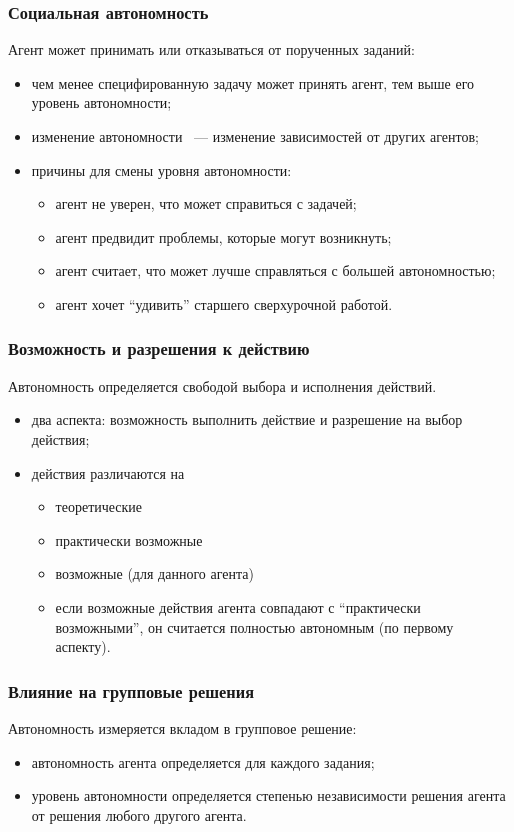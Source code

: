 \documentclass{beamer}
\begin{document}
\begin{frame}
  \frametitle{Социальная автономность}
  Агент может принимать или отказываться от порученных заданий:
  \begin{itemize}
    \item чем менее специфированную задачу может принять агент, тем выше его уровень автономности;
    \item изменение автономности ~--- изменение зависимостей от других агентов;
    \item причины для смены уровня автономности:
      \begin{itemize}
        \item агент не уверен, что может справиться с задачей;
        \item агент предвидит проблемы, которые могут возникнуть;
        \item агент считает, что может лучше справляться с большей автономностью;
        \item агент хочет ``удивить'' старшего сверхурочной работой.
      \end{itemize}
  \end{itemize}
\end{frame}

\begin{frame}
  \frametitle{Возможность и разрешения к действию}
  Автономность определяется свободой выбора и исполнения действий.
  \begin{itemize}
    \item два аспекта: возможность выполнить действие и разрешение на выбор действия;
    \item действия различаются на
      \begin{itemize}
        \item теоретические
        \item практически возможные
        \item возможные (для данного агента)
        \item если возможные действия агента совпадают с ``практически возможными'',
          он считается полностью автономным (по первому аспекту).
      \end{itemize}
  \end{itemize}
\end{frame}

\begin{frame}
  \frametitle{Влияние на групповые решения}
  Автономность измеряется вкладом в групповое решение:
  \begin{itemize}
    \item автономность агента определяется для каждого задания;
    \item уровень автономности определяется степенью независимости
      решения агента от решения любого другого агента.
  \end{itemize}
\end{frame}
\end{document}
